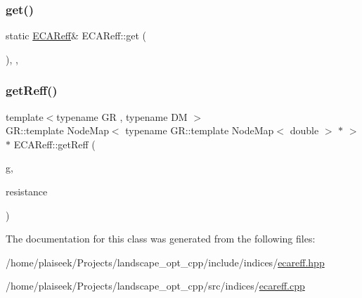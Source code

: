 \subsubsection{\texorpdfstring{get()}{get()}}
{\footnotesize\ttfamily static \hyperlink{class_e_c_a_reff}{E\+C\+A\+Reff}\& E\+C\+A\+Reff\+::get (\begin{DoxyParamCaption}{ }\end{DoxyParamCaption})\hspace{0.3cm}{\ttfamily [inline]}, {\ttfamily [static]}, {\ttfamily [noexcept]}}

\mbox{\label{class_e_c_a_reff_afa9b4d597a1771f154eb1179ebfcfd7c}} 
\subsubsection{\texorpdfstring{get\+Reff()}{getReff()}}
{\footnotesize\ttfamily template$<$typename GR , typename DM $>$ \\
G\+R\+::template Node\+Map$<$ typename G\+R\+::template Node\+Map$<$ double $>$ $\ast$ $>$ $\ast$ E\+C\+A\+Reff\+::get\+Reff (\begin{DoxyParamCaption}\item[{const GR \&}]{g,  }\item[{const DM \&}]{resistance }\end{DoxyParamCaption})}



The documentation for this class was generated from the following files\+:\begin{DoxyCompactItemize}
\item 
/home/plaiseek/\+Projects/landscape\+\_\+opt\+\_\+cpp/include/indices/\hyperlink{ecareff_8hpp}{ecareff.\+hpp}\item 
/home/plaiseek/\+Projects/landscape\+\_\+opt\+\_\+cpp/src/indices/\hyperlink{ecareff_8cpp}{ecareff.\+cpp}\end{DoxyCompactItemize}
